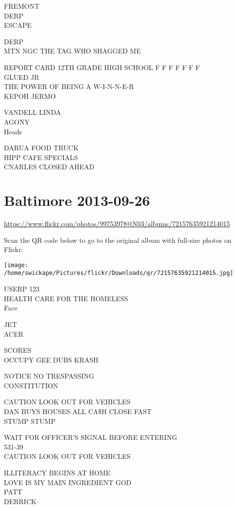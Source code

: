 \documentclass[10pt,letterpaper]{article}
\begin{document}
FREMONT\\
DERP\\
ESCAPE

DERP\\
MTN NGC THE TAG WHO SHAGGED ME

REPORT CARD 12TH GRADE HIGH SCHOOL F F F F F F F\\
GLUED JR\\
THE POWER OF BEING A W{-}I{-}N{-}N{-}E{-}R\\
KEPOH JERMO

VANDELL LINDA\\
AGONY\\
Heads

DARUA FOOD TRUCK\\
HIPP CAFE SPECIALS\\
CNARLES CLOSED AHEAD
\pagebreak

\section*{Baltimore 2013-09-26}

\url{https://www.flickr.com/photos/99753978@N03/albums/72157635921214015}

Scan the QR code below to go to the original album with full-size photos on Flickr:

\texttt{[image: /home/swickape/Pictures/flickr/Downloads/qr/72157635921214015.jpg]}
\pagebreak

USERP 123\\
HEALTH CARE FOR THE HOMELESS\\
Face

JET\\
ACER

SCORES\\
OCCUPY GEE DUBS KRASH

NOTICE NO TRESPASSING\\
CONSTITUTION

CAUTION LOOK OUT FOR VEHICLES\\
DAN BUYS HOUSES ALL CA\$H CLOSE FAST\\
STUMP STUMP

WAIT FOR OFFICER'S SIGNAL BEFORE ENTERING\\
531{-}39\\
CAUTION LOOK OUT FOR VEHICLES

ILLITERACY BEGINS AT HOME\\
LOVE IS MY MAIN INGREDIENT GOD\\
PATT\\
DERRICK
\end{document}
